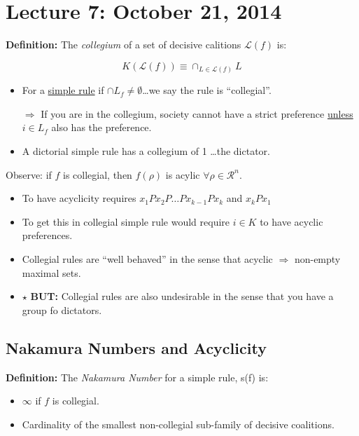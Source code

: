 \documentclass{article}
\newcommand{\R}{\mathcal{R}}
\newcommand{\Lm}{\mathcal{L}}
\begin{document}
\section*{Lecture 7: October 21, 2014}

\textbf{Definition:} The \emph{collegium} of a set of decisive calitions $\Lm(f)$ is:

\[
K(\Lm(f)) \equiv \cap_{L\in\Lm(f)}L
\]

\begin{itemize}

\item For a \underline{simple rule} if $\cap L_f \neq \emptyset$\dots we say the rule is ``collegial''. 

$\Rightarrow$ If you are in the collegium, society cannot have a strict preference \underline{unless} $i \in L_f$ also has the preference.


\item A dictorial simple rule has a collegium of 1 \dots the dictator.
\end{itemize}

Observe: if $f$ is collegial, then $f(\rho)$ is acylic $\forall \rho \in \R^n$.

\begin{itemize}

\item To have acyclicity requires $x_1Px_2P\dots Px_{k-1}Px_k$ and $x_kPx_1$
\item To get this in collegial simple rule would require $i \in K$ to have acyclic preferences.
\item Collegial rules are   ``well behaved'' in the sense that acyclic $\Rightarrow$ non-empty maximal sets.
\item $\star$ \textbf{BUT:} Collegial rules are also undesirable in the sense that you have a group fo dictators.
\end{itemize}

\subsection*{Nakamura Numbers and Acyclicity}

\textbf{Definition:} The \emph{Nakamura Number} for a simple rule, s(f) is:

\begin{itemize}

\item $\infty$ if $f$ is collegial.
\item Cardinality of the smallest non-collegial sub-family of decisive coalitions.
\end{itemize}
\end{document}
